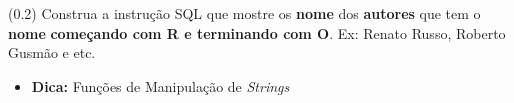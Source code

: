 \documentclass[12pt]{exam}
\begin{document}
\begin{questions}











\question (0.2)  Construa a instrução SQL que mostre os \textbf{nome} dos \textbf{autores} que tem o \textbf{nome} \textbf{começando com R e terminando com O}. Ex: Renato Russo, Roberto Gusmão e etc.

\begin{itemize}
    \item \textbf{Dica:} Funções de Manipulação de \textit{Strings}
\end{itemize}


\end{questions}
\end{document}
